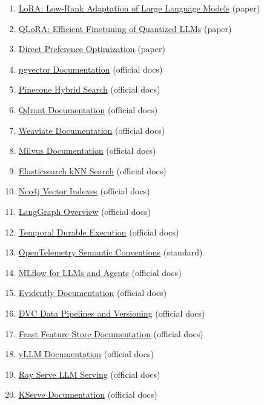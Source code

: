 \begin{enumerate}
\item \href{https://arxiv.org/abs/2106.09685}{LoRA: Low-Rank Adaptation of Large Language Models} (paper)
\item \href{https://arxiv.org/abs/2305.14314}{QLoRA: Efficient Finetuning of Quantized LLMs} (paper)
\item \href{https://arxiv.org/abs/2305.18290}{Direct Preference Optimization} (paper)
\item \href{https://github.com/pgvector/pgvector}{pgvector Documentation} (official docs)
\item \href{https://docs.pinecone.io/guides/search/hybrid-search}{Pinecone Hybrid Search} (official docs)
\item \href{https://qdrant.tech/documentation/}{Qdrant Documentation} (official docs)
\item \href{https://docs.weaviate.io/weaviate}{Weaviate Documentation} (official docs)
\item \href{https://milvus.io/docs}{Milvus Documentation} (official docs)
\item \href{https://www.elastic.co/docs/solutions/search/vector/knn}{Elasticsearch kNN Search} (official docs)
\item \href{https://neo4j.com/docs/cypher-manual/current/indexes/semantic-indexes/vector-indexes/}{Neo4j Vector Indexes} (official docs)
\item \href{https://docs.langchain.com/oss/python/langgraph/overview}{LangGraph Overview} (official docs)
\item \href{https://docs.temporal.io/}{Temporal Durable Execution} (official docs)
\item \href{https://opentelemetry.io/docs/specs/semconv/}{OpenTelemetry Semantic Conventions} (standard)
\item \href{https://mlflow.org/docs/latest/genai/}{MLflow for LLMs and Agents} (official docs)
\item \href{https://docs.evidentlyai.com/}{Evidently Documentation} (official docs)
\item \href{https://doc.dvc.org/start/data-pipelines/data-pipelines}{DVC Data Pipelines and Versioning} (official docs)
\item \href{https://docs.feast.dev/}{Feast Feature Store Documentation} (official docs)
\item \href{https://docs.vllm.ai/}{vLLM Documentation} (official docs)
\item \href{https://docs.ray.io/en/latest/serve/llm/}{Ray Serve LLM Serving} (official docs)
\item \href{https://kserve.github.io/website/}{KServe Documentation} (official docs)

\end{enumerate}
